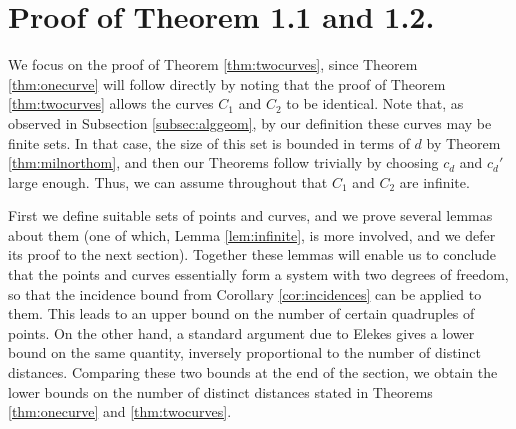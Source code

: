 \documentclass[12pt]{article}
\begin{document}

\section{Proof of Theorem 1.1 and 1.2.}\label{sec:proofoftheorems}
We focus on the proof of Theorem \ref{thm:twocurves}, since Theorem \ref{thm:onecurve} will follow directly by noting that the proof of Theorem \ref{thm:twocurves} allows the curves $C_1$ and $C_2$ to be identical.
Note that, as observed in Subsection \ref{subsec:alggeom}, by our definition these curves may be finite sets. 
In that case, the size of this set is bounded in terms of $d$ by Theorem \ref{thm:milnorthom}, and then our Theorems follow trivially by choosing $c_d$ and $c_d'$ large enough.
Thus, we can assume throughout that $C_1$ and $C_2$ are infinite.


First we define suitable sets of points and curves, and we prove several lemmas about them 
(one of which, Lemma \ref{lem:infinite}, is more involved, and we defer its proof to the next section).
Together these lemmas will enable us to conclude 
that the points and curves essentially form a system with two degrees of freedom, 
so that the incidence bound from Corollary \ref{cor:incidences} can be applied to them. 
This leads to an upper bound on the number of certain quadruples of points. 
On the other hand, a standard argument due to Elekes gives a lower bound on the same quantity, 
inversely proportional to the number of distinct distances. 
Comparing these two bounds at the end of the section,
we obtain the lower bounds on the number of distinct distances
stated in Theorems \ref{thm:onecurve} and \ref{thm:twocurves}. 
 
\end{document}
